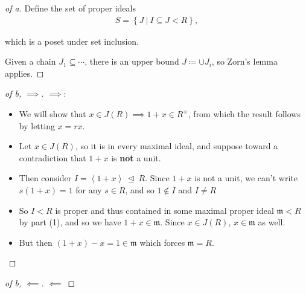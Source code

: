 \begin{solution}

\envlist

\begin{proof}[of a]

Define the set of proper ideals
\begin{align*}
S = \left\{{J {~\mathrel{\Big|}~}I   \subseteq J < R}\right\}
,\end{align*}

which is a poset under set inclusion.

Given a chain \(J_1 \subseteq \cdots\), there is an upper bound
\(J \coloneqq\cup J_i\), so Zorn's lemma applies.

\end{proof}

\begin{proof}[of b, $\implies$]

\(\implies\):

\begin{itemize}
\item
  We will show that \(x\in J(R) \implies 1+x \in R^{\times}\), from
  which the result follows by letting \(x=rx\).
\item
  Let \(x\in J(R)\), so it is in every maximal ideal, and suppose toward
  a contradiction that \(1+x\) is \textbf{not} a unit.
\item
  Then consider
  \(I = \left\langle{1+x}\right\rangle {~\trianglelefteq~}R\). Since
  \(1+x\) is not a unit, we can't write \(s(1+x) = 1\) for any
  \(s\in R\), and so \(1 \not\in I\) and \(I\neq R\)
\item
  So \(I < R\) is proper and thus contained in some maximal proper ideal
  \(\mathfrak{m} < R\) by part (1), and so we have
  \(1+x \in \mathfrak{m}\). Since \(x\in J(R)\), \(x\in \mathfrak{m}\)
  as well.
\item
  But then \((1+x) - x = 1 \in \mathfrak{m}\) which forces
  \(\mathfrak{m} = R\).
\end{itemize}

\end{proof}

\begin{proof}[of b, $\impliedby$]

\(\impliedby\)


\end{proof}
\end{solution}
